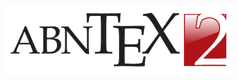 \documentclass[
	10pt,				%
	openright,			%
	twoside,			%
	a5paper,			%
	english,			%
	french,				%
	brazil,				%
	sumario=tradicional
]{abntex2}
\begin{document}
\frenchspacing

\frontmatter

\begin{titlingpage}
\phantom{xxx}
\vspace{0.5cm}
\huge
\raggedright
\imprimirautor\\
\vspace{2.5cm}
\huge 
{\raggedleft
\includegraphics[scale=0.9]{abntex2-modelo-img-marca.pdf}\\[1cm]
\textit{\textcolor{blue}{\imprimirtitulo}}\\[1cm]
}
\centering 
  %
\vfill
\Large
 %
\imprimirinstituicao
\end{titlingpage}
\end{document}

